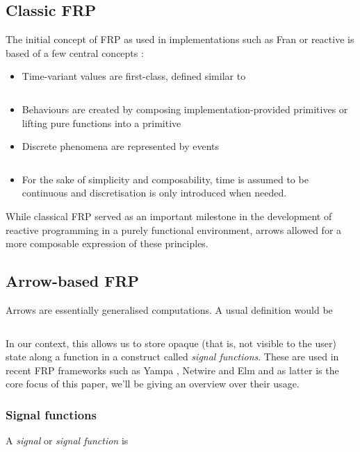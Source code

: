 \documentclass[pdftex,a4paper]{extarticle}
\begin{document}
\subsection{Classic FRP}
The initial concept of FRP as used in implementations such as Fran \cite{ElliottHudak97:Fran} or reactive \cite{haskell-wiki-reactive} is based of a few central concepts \cite{conal-what-is-frp,Elliott2009-push-pull-frp}:
\begin{itemize}
\item Time-variant values are first-class, defined similar to
\inputminted{haskell}{Behaviour.hs}
\item Behaviours are created by composing implementation-provided primitives or lifting pure functions into a primitive
\item Discrete phenomena are represented by events
\inputminted{haskell}{Event.hs}
\item For the sake of simplicity and composability, time is assumed to be continuous and discretisation is only introduced when needed.
\end{itemize}

While classical FRP served as an important milestone in the development of reactive programming in a purely functional environment, arrows allowed for a more composable expression of these principles.

\subsection{Arrow-based FRP}
Arrows are essentially generalised computations. A usual definition would be
\inputminted{haskell}{Arrow.hs}

In our context, this allows us to store opaque (that is, not visible to the user) state along a function in a construct called \emph{signal functions}.
These are used in recent FRP frameworks such as Yampa \cite{hudak2003arrows}, Netwire \cite{haskell-wiki-netwire} and Elm \cite{elm-lang} and as latter is the core focus of this paper, we'll be giving an overview over their usage.

\subsubsection{Signal functions}
A \emph{signal} or \emph{signal function} is 
\begin{figure}[ht]
\centering
{}
\label{fig:sigfunc}
\end{figure}
\end{document}
